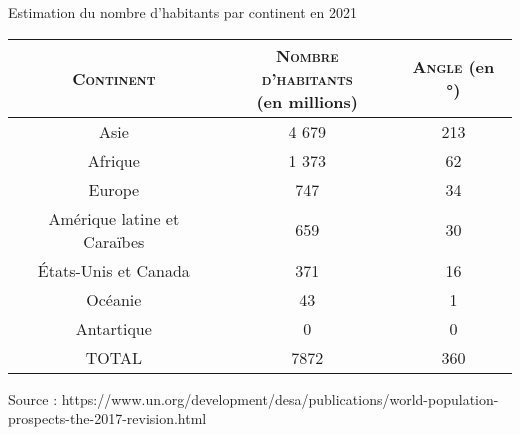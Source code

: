 \documentclass[../Cours.tex]{subfiles}
\begin{document}
\begin{center}
    Estimation du nombre d'habitants par continent en 2021\\
    \begin{tabular}{|c|c||c|}\hline
        \textsc{Continent} & \makecell{\textsc{Nombre d'habitants}\\ (en millions)} & \textsc{Angle} (en °) \\\hline
        Asie & 4 679 & 213 \\\hline
        Afrique & 1 373 & 62 \\\hline
        Europe & 747 & 34 \\\hline
        Amérique latine et Caraïbes & 659 & 30 \\\hline
        États-Unis et Canada & 371 & 16 \\\hline
        Océanie & 43 & 1 \\\hline 
        Antartique & 0 & 0 \\\hline
        \textsc{TOTAL} & 7872 & 360 \\\hline 
    \end{tabular}
\end{center}

\begin{flushright}
    \tiny{Source : https://www.un.org/development/desa/publications/world-population-prospects-the-2017-revision.html}
\end{flushright}

\vspace{1cm}

\newcommand{\macroLegende}[3]{ %
    \draw[fill=#3] (4,#1) rectangle (4,{#1+0.3});
    \node[above right] (4,#1) {#2};
}

\begin{center}
\end{center}
\end{document}

